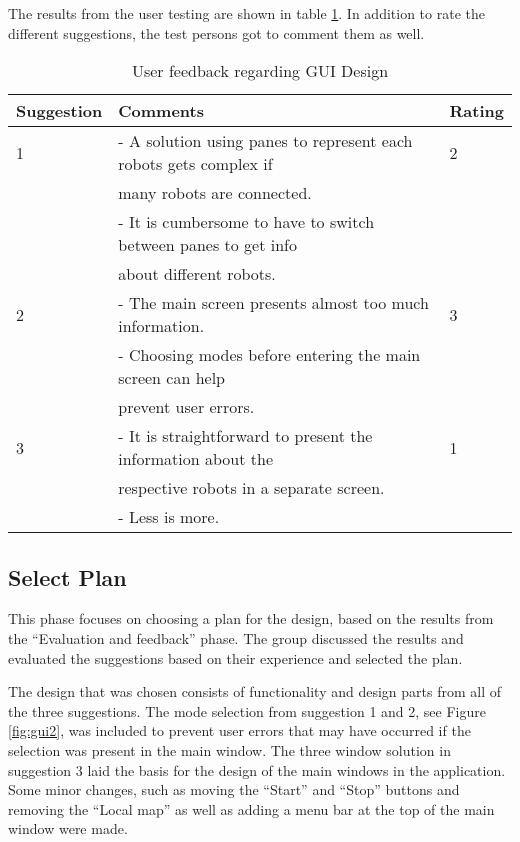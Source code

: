 The results from the user testing are shown in table \ref{tab:guifeedback}. In addition to rate the different suggestions, the test persons got to comment them as well.

\begin{table}[ht]
\begin{center}
\begin{tabular}{|l|l|l|} 
\hline
Suggestion  &   Comments & Rating \\
 \hline
1           &   - A solution using panes to represent each robots gets complex if & 2\\
            &   many robots are connected. & \\
            &   - It is cumbersome to have to switch between panes to get info &\\
            &   about different robots. & \\
\hline
2           &   - The main screen presents almost too much information.  & 3\\
            &   - Choosing modes before entering the main screen can help &\\
            &   prevent user errors.  &\\
\hline
3           &   - It is straightforward to present the information about the & 1\\
            &   respective robots in a separate screen.  &\\
            &   - Less is more.  &\\
\hline
\end{tabular}
\end{center}
\caption{User feedback regarding GUI Design}
\label{tab:guifeedback}
\end{table}


\subsection{Select Plan}
\label{sec:selectplan}
This phase focuses on choosing a plan for the design, based on the results from the ``Evaluation and feedback'' phase. The group discussed the results and evaluated the suggestions based on their experience and selected the plan.

The design that was chosen consists of functionality and design parts from all of the three suggestions. The mode selection from suggestion 1 and 2, see Figure \ref{fig:gui2}, was included to prevent user errors that may have occurred if the selection was present in the main window. The three window solution in suggestion 3 laid the basis for the design of the main windows in the application. Some minor changes, such as moving the ``Start'' and ``Stop'' buttons and removing the ``Local map'' as well as adding a menu bar at the top of the main window were made. 